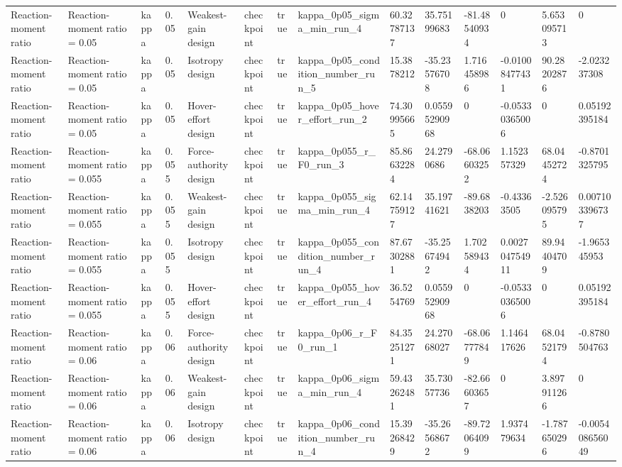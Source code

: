 \begin{tabular}{@{}llllllllllllll@{}}
Reaction-moment ratio & Reaction-moment ratio = 0.05 & kappa & 0.05 & Weakest-gain design & checkpoint & true & kappa\_0p05\_sigma\_min\_run\_4 & 60.32787137 & 35.75199683 & -81.48540934 & 0 & 5.653095713 & 0 \\
Reaction-moment ratio & Reaction-moment ratio = 0.05 & kappa & 0.05 & Isotropy design & checkpoint & true & kappa\_0p05\_condition\_number\_run\_5 & 15.3878212 & -35.23576708 & 1.716458986 & -0.01008477431 & 90.28202876 & -2.023237308 \\
Reaction-moment ratio & Reaction-moment ratio = 0.05 & kappa & 0.05 & Hover-effort design & checkpoint & true & kappa\_0p05\_hover\_effort\_run\_2 & 74.30995665 & 0.05595290968 & 0 & -0.05330365006 & 0 & 0.05192395184 \\
Reaction-moment ratio & Reaction-moment ratio = 0.055 & kappa & 0.055 & Force-authority design & checkpoint & true & kappa\_0p055\_r\_F0\_run\_3 & 85.86632284 & 24.2790686 & -68.06603252 & 1.152357329 & 68.04452724 & -0.8701325795 \\
Reaction-moment ratio & Reaction-moment ratio = 0.055 & kappa & 0.055 & Weakest-gain design & checkpoint & true & kappa\_0p055\_sigma\_min\_run\_4 & 62.14759127 & 35.19741621 & -89.6838203 & -0.43363505 & -2.526095795 & 0.007103396737 \\
Reaction-moment ratio & Reaction-moment ratio = 0.055 & kappa & 0.055 & Isotropy design & checkpoint & true & kappa\_0p055\_condition\_number\_run\_4 & 87.67302881 & -35.25674942 & 1.702589434 & 0.002704754911 & 89.94404709 & -1.965345953 \\
Reaction-moment ratio & Reaction-moment ratio = 0.055 & kappa & 0.055 & Hover-effort design & checkpoint & true & kappa\_0p055\_hover\_effort\_run\_4 & 36.5254769 & 0.05595290968 & 0 & -0.05330365006 & 0 & 0.05192395184 \\
Reaction-moment ratio & Reaction-moment ratio = 0.06 & kappa & 0.06 & Force-authority design & checkpoint & true & kappa\_0p06\_r\_F0\_run\_1 & 84.35251271 & 24.27068027 & -68.06777849 & 1.146417626 & 68.04521794 & -0.8780504763 \\
Reaction-moment ratio & Reaction-moment ratio = 0.06 & kappa & 0.06 & Weakest-gain design & checkpoint & true & kappa\_0p06\_sigma\_min\_run\_4 & 59.43262481 & 35.73057736 & -82.66603657 & 0 & 3.897911266 & 0 \\
Reaction-moment ratio & Reaction-moment ratio = 0.06 & kappa & 0.06 & Isotropy design & checkpoint & true & kappa\_0p06\_condition\_number\_run\_4 & 15.39268429 & -35.26568672 & -89.72064099 & 1.937479634 & -1.787650296 & -0.005408656049 \\

\end{tabular}
